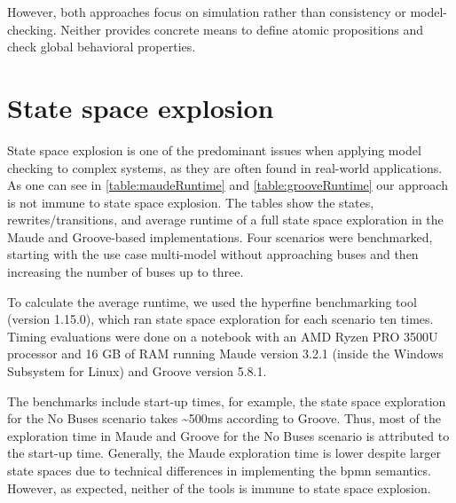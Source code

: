 \documentclass{jot}
\begin{document}
However, both approaches focus on simulation rather than consistency or model-checking.
Neither provides concrete means to define atomic propositions and check global behavioral properties.

\section{State space explosion} \label{sec:state_space_explosion}
State space explosion is one of the predominant issues when applying model checking to complex systems, as they are often found in real-world applications.
As one can see in \autoref{table:maudeRuntime} and \autoref{table:grooveRuntime} our approach is not immune to state space explosion.
The tables show the states, rewrites/transitions, and average runtime of a full state space exploration in the Maude and Groove-based implementations.
Four scenarios were benchmarked, starting with the use case multi-model without approaching buses and then increasing the number of buses up to three.

To calculate the average runtime, we used the hyperfine benchmarking tool \cite{peterHyperfine2022} (version 1.15.0), which ran state space exploration for each scenario ten times.
Timing evaluations were done on a notebook with an AMD Ryzen PRO 3500U processor and 16 GB of RAM running Maude version 3.2.1 (inside the Windows Subsystem for Linux) and Groove version 5.8.1.

The benchmarks include start-up times, for example, the state space exploration for the \textsf{No Buses} scenario takes \textasciitilde 500ms according to Groove.
Thus, most of the exploration time in Maude and Groove for the \textsf{No Buses} scenario is attributed to the start-up time.
Generally, the Maude exploration time is lower despite larger state spaces due to technical differences in implementing the \gls*{bpmn} semantics.
However, as expected, neither of the tools is immune to state space explosion.
\end{document}
